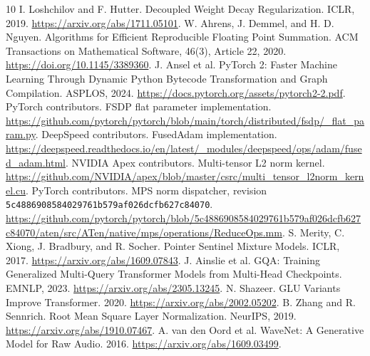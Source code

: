 \documentclass[11pt]{article}
\newcommand{\code}[1]{\texttt{#1}}
\begin{document}
\begin{thebibliography}{10}
 I. Loshchilov and F. Hutter. Decoupled Weight Decay
Regularization. ICLR, 2019. \url{https://arxiv.org/abs/1711.05101}.
 W. Ahrens, J. Demmel, and H. D. Nguyen. Algorithms for
Efficient Reproducible Floating Point Summation. ACM Transactions on
Mathematical Software, 46(3), Article 22, 2020.
\url{https://doi.org/10.1145/3389360}.
 J. Ansel et al. PyTorch 2: Faster Machine Learning Through
Dynamic Python Bytecode Transformation and Graph Compilation. ASPLOS, 2024.
\url{https://docs.pytorch.org/assets/pytorch2-2.pdf}.
 PyTorch contributors. FSDP flat parameter implementation.
\url{https://github.com/pytorch/pytorch/blob/main/torch/distributed/fsdp/_flat_param.py}.
 DeepSpeed contributors. FusedAdam implementation.
\url{https://deepspeed.readthedocs.io/en/latest/_modules/deepspeed/ops/adam/fused_adam.html}.
 NVIDIA Apex contributors. Multi-tensor L2 norm kernel.
\url{https://github.com/NVIDIA/apex/blob/master/csrc/multi_tensor_l2norm_kernel.cu}.
 PyTorch contributors. MPS norm dispatcher, revision
\code{5c4886908584029761b579af026dcfb627c84070}.
\url{https://github.com/pytorch/pytorch/blob/5c4886908584029761b579af026dcfb627c84070/aten/src/ATen/native/mps/operations/ReduceOps.mm}.
 S. Merity, C. Xiong, J. Bradbury, and R. Socher. Pointer
Sentinel Mixture Models. ICLR, 2017. \url{https://arxiv.org/abs/1609.07843}.
 J. Ainslie et al. GQA: Training Generalized Multi-Query Transformer
Models from Multi-Head Checkpoints. EMNLP, 2023. \url{https://arxiv.org/abs/2305.13245}.
 N. Shazeer. GLU Variants Improve Transformer. 2020.
\url{https://arxiv.org/abs/2002.05202}.
 B. Zhang and R. Sennrich. Root Mean Square Layer Normalization.
NeurIPS, 2019. \url{https://arxiv.org/abs/1910.07467}.
 A. van den Oord et al. WaveNet: A Generative Model for Raw
Audio. 2016. \url{https://arxiv.org/abs/1609.03499}.
\end{thebibliography}

\appendix
\end{document}
